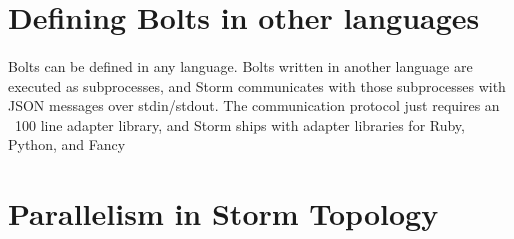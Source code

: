 \documentclass{article}
\begin{document}
    \section{Defining Bolts in other languages}
    \paragraph{}
       Bolts can be defined in any language. Bolts written in another language
       are executed as subprocesses, and Storm communicates with those
       subprocesses with JSON messages over stdin/stdout. The communication
       protocol just requires an ~100 line adapter library, and Storm ships with
       adapter libraries for Ruby, Python, and Fancy 

    \section{Parallelism in Storm Topology}
\end{document}
